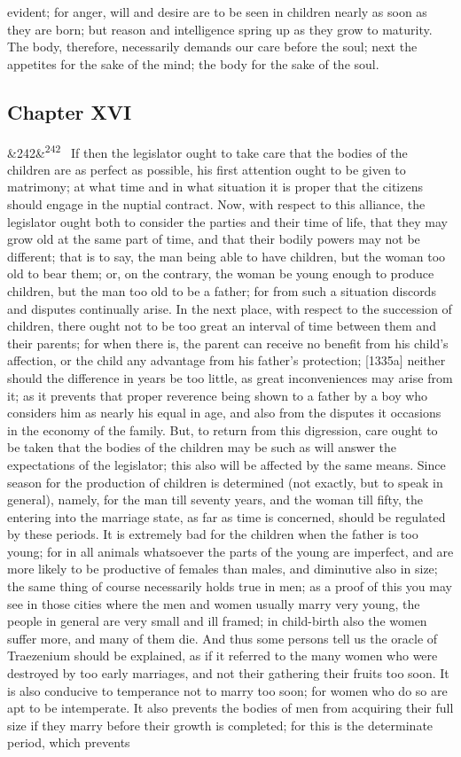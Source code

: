 \documentclass[12pt]{article}
\newcommand{\para}[1][]{\par\noindent\ifx&#1&\else\textsuperscript{\footnotesize #1}~\fi}
\begin{document}
evident; for anger, will and desire are to be seen in children nearly as soon as they are born; but reason and intelligence spring up as they grow to maturity. The body, therefore, necessarily demands our care before the soul; next the appetites for the sake of the mind; the body for the sake of the soul.

\subsection*{Chapter XVI}

\para[242] If then the legislator ought to take care that the bodies of the children are as perfect as possible, his first attention ought to be given to matrimony; at what time and in what situation it is proper that the citizens should engage in the nuptial contract. Now, with respect to this alliance, the legislator ought both to consider the parties and their time of life, that they may grow old at the same part of time, and that their bodily powers may not be different; that is to say, the man being able to have children, but the woman too old to bear them; or, on the contrary, the woman be young enough to produce children, but the man too old to be a father; for from such a situation discords and disputes continually arise. In the next place, with respect to the succession of children, there ought not to be too great an interval of time between them and their parents; for when there is, the parent can receive no benefit from his child's affection, or the child any advantage from his father's protection; [1335a] neither should the difference in years be too little, as great inconveniences may arise from it; as it prevents that proper reverence being shown to a father by a boy who considers him as nearly his equal in age, and also from the disputes it occasions in the economy of the family. But, to return from this digression, care ought to be taken that the bodies of the children may be such as will answer the expectations of the legislator; this also will be affected by the same means. Since season for the production of children is determined (not exactly, but to speak in general), namely, for the man till seventy years, and the woman till fifty, the entering into the marriage state, as far as time is concerned, should be regulated by these periods. It is extremely bad for the children when the father is too young; for in all animals whatsoever the parts of the young are imperfect, and are more likely to be productive of females than males, and diminutive also in size; the same thing of course necessarily holds true in men; as a proof of this you may see in those cities where the men and women usually marry very young, the people in general are very small and ill framed; in child-birth also the women suffer more, and many of them die. And thus some persons tell us the oracle of Traezenium should be explained, as if it referred to the many women who were destroyed by too early marriages, and not their gathering their fruits too soon. It is also conducive to temperance not to marry too soon; for women who do so are apt to be intemperate. It also prevents the bodies of men from acquiring their full size if they marry before their growth is completed; for this is the determinate period, which prevents 
\end{document}
